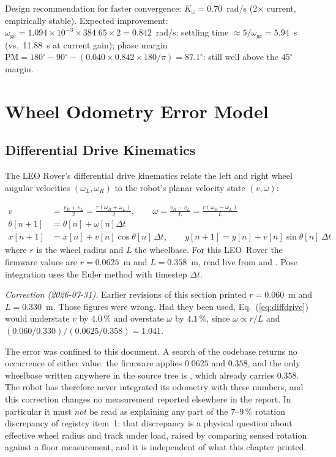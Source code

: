 \begin{eqblock}
Design recommendation for faster convergence: $K_\omega = 0.70$~rad/s (2$\times$ current, empirically stable). Expected improvement: $\omega_{\text{gc}} = 1.094\times10^{-3}\times384.65\times2 = 0.842$~rad/s; settling time $\approx 5/\omega_{\text{gc}} = 5.94$~s (vs.\ 11.88~s at current gain); phase margin $\text{PM} = 180^\circ - 90^\circ - (0.040\times0.842\times180/\pi) = 87.1^\circ$: still well above the $45^\circ$ margin.
\end{eqblock}

\section{Wheel Odometry Error Model}

\subsection{Differential Drive Kinematics}

The LEO Rover's differential drive kinematics relate the left and right wheel angular velocities $(\omega_L,\omega_R)$ to the robot's planar velocity state $(v,\omega)$:

\begin{eqblock}
\begin{align}
v &= \frac{v_R+v_L}{2} = \frac{r(\omega_R+\omega_L)}{2}, \qquad \omega = \frac{v_R-v_L}{L} = \frac{r(\omega_R-\omega_L)}{L} \\
\theta[n{+}1] &= \theta[n] + \omega[n]\Delta t \\
x[n{+}1] &= x[n] + v[n]\cos\theta[n]\,\Delta t, \qquad y[n{+}1] = y[n] + v[n]\sin\theta[n]\,\Delta t\label{eq:diffdrive}
\end{align}
where $r$ is the wheel radius and $L$ the wheelbase. For this LEO~Rover the firmware values are $r = 0.0625$~m and $L = 0.358$~m, read live from  and . Pose integration uses the Euler method with timestep $\Delta t$.

\emph{Correction (2026-07-31).} Earlier revisions of this section printed $r = 0.060$~m and $L = 0.330$~m. Those figures were wrong. Had they been used, Eq.~(\ref{eq:diffdrive}) would understate $v$ by $4.0\,\%$ and overstate $\omega$ by $4.1\,\%$, since $\omega \propto r/L$ and $(0.060/0.330)/(0.0625/0.358) = 1.041$.

The error was confined to this document. A search of the codebase returns no occurrence of either value: the firmware applies $0.0625$ and $0.358$, and the only wheelbase written anywhere in the source tree is , which already carries $0.358$. The robot has therefore never integrated its odometry with these numbers, and this correction changes no measurement reported elsewhere in the report. In particular it must \emph{not} be read as explaining any part of the $7$--$9\,\%$ rotation discrepancy of registry item~1: that discrepancy is a physical question about effective wheel radius and track under load, raised by comparing sensed rotation against a floor measurement, and it is independent of what this chapter printed.
\end{eqblock}

